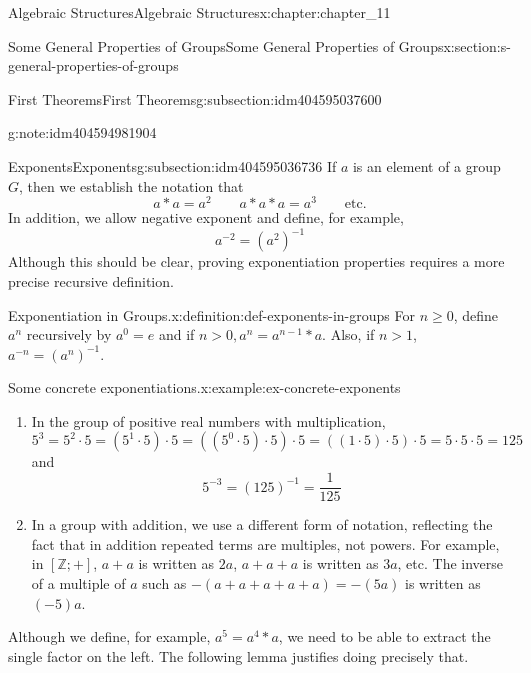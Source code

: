 \documentclass[twoside,10pt,]{book}
\numberwithin{equation}{section}
\begin{document}
\begin{chapterptx}{Algebraic Structures}{}{Algebraic Structures}{}{}{x:chapter:chapter_11}
\begin{sectionptx}{Some General Properties of Groups}{}{Some General Properties of Groups}{}{}{x:section:s-general-properties-of-groups}
\begin{subsectionptx}{First Theorems}{}{First Theorems}{}{}{g:subsection:idm404595037600}
\begin{note}{}{g:note:idm404594981904}
%
\end{note}
\end{subsectionptx}
%
%
\typeout{************************************************}
\typeout{************************************************}
%
\begin{subsectionptx}{Exponents}{}{Exponents}{}{}{g:subsection:idm404595036736}
If \(a\) is an element of a group \(G\), then we establish the notation that%
\begin{equation*}
a * a = a^2\quad \quad
a*a*a=a^3\quad \quad
\textrm{etc.}
\end{equation*}
In addition, we allow negative exponent and define, for example,%
\begin{equation*}
a^{-2}= \left(a^2\right)^{-1}
\end{equation*}
Although this should be clear, proving exponentiation properties requires a more precise recursive definition.%
\begin{definition}{Exponentiation in Groups.}{x:definition:def-exponents-in-groups}%
%
For \(n \geq  0\), define \(a^n\) recursively by \(a ^0 = e\) and if \(n > 0, a^n= a^{n-1} *a\). Also, if \(n >1\), \(a^{-n}= \left(a^n\right)^{-1}\).%
\end{definition}
\begin{example}{Some concrete exponentiations.}{x:example:ex-concrete-exponents}%
%
\begin{enumerate}[label=(\alph*)]
\item{}In the group of positive real numbers with multiplication,%
\begin{equation*}
5^3= 5^2\cdot 5 =\left(5^1\cdot 5\right)\cdot 5=\left(\left(5^0\cdot 5\right)\cdot 5\right)\cdot 5=((1\cdot 5)\cdot 5)\cdot 5=
5 \cdot 5\cdot 5=125
\end{equation*}
and%
\begin{equation*}
5^{-3}= (125)^{-1}= \frac{1}{125}
\end{equation*}
%
\item{}In a group with addition, we use a different form of notation, reflecting the fact that in addition repeated terms are multiples, not powers. For example, in \([\mathbb{Z}; +]\), \(a + a\) is written as \(2a\), \(a + a + a\) is written as \(3a\), etc. The inverse of a multiple of \(a\) such as \(- (a + a + a + a + a) = -(5a)\) is written as \((-5)a\).%
\end{enumerate}
%
\end{example}
Although we define, for example, \(a^5=a^4* a\), we need to be able to extract the single factor on the left.  The following lemma justifies doing precisely that.%

\end{subsectionptx}
\end{sectionptx}
\end{chapterptx}
\end{document}
